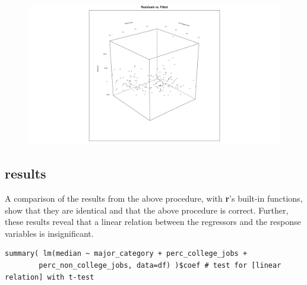 \documentclass[10pt, twoside, openleft]{article}
\begin{document}
\begin{figure}[H]
\centering
\includegraphics[scale=0.365]{plot2}
\caption{}
\end{figure}

\begin{center}
\subsection{results}
\vspace{-3ex}
\end{center}

\noindent
A comparison of the results from the above procedure, with \textbf{r}'s built-in functions,
show that they are identical and that the above procedure is correct. Further, these
results reveal that a linear relation between the regressors and the response variables is
insignificant.
\smallskip

\begin{verbatim}
summary( lm(median ~ major_category + perc_college_jobs +
	    perc_non_college_jobs, data=df) )$coef # test for [linear relation] with t-test
\end{verbatim}
\end{document}
